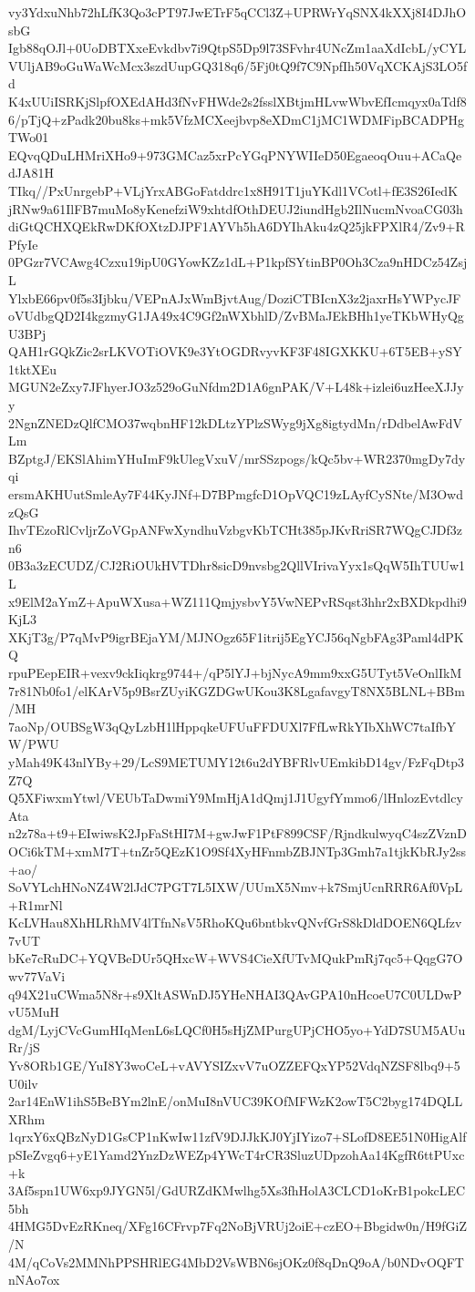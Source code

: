 vy3YdxuNhb72hLfK3Qo3cPT97JwETrF5qCCl3Z+UPRWrYqSNX4kXXj8I4DJhOsbG
Igb88qOJl+0UoDBTXxeEvkdbv7i9QtpS5Dp9l73SFvhr4UNcZm1aaXdIcbL/yCYL
VUljAB9oGuWaWcMcx3szdUupGQ318q6/5Fj0tQ9f7C9NpfIh50VqXCKAjS3LO5fd
K4xUUiISRKjSlpfOXEdAHd3fNvFHWde2s2fsslXBtjmHLvwWbvEfIcmqyx0aTdf8
6/pTjQ+zPadk20bu8ks+mk5VfzMCXeejbvp8eXDmC1jMC1WDMFipBCADPHgTWo01
EQvqQDuLHMriXHo9+973GMCaz5xrPcYGqPNYWIIeD50EgaeoqOuu+ACaQedJA81H
TIkq//PxUnrgebP+VLjYrxABGoFatddrc1x8H91T1juYKdl1VCotl+fE3S26IedK
jRNw9a61IlFB7muMo8yKenefziW9xhtdfOthDEUJ2iundHgb2IlNucmNvoaCG03h
diGtQCHXQEkRwDKfOXtzDJPF1AYVh5hA6DYIhAku4zQ25jkFPXlR4/Zv9+RPfyIe
0PGzr7VCAwg4Czxu19ipU0GYowKZz1dL+P1kpfSYtinBP0Oh3Cza9nHDCz54ZsjL
YlxbE66pv0f5s3Ijbku/VEPnAJxWmBjvtAug/DoziCTBIcnX3z2jaxrHsYWPycJF
oVUdbgQD2I4kgzmyG1JA49x4C9Gf2nWXbhlD/ZvBMaJEkBHh1yeTKbWHyQgU3BPj
QAH1rGQkZic2srLKVOTiOVK9e3YtOGDRvyvKF3F48IGXKKU+6T5EB+ySY1tktXEu
MGUN2eZxy7JFhyerJO3z529oGuNfdm2D1A6gnPAK/V+L48k+izlei6uzHeeXJJyy
2NgnZNEDzQlfCMO37wqbnHF12kDLtzYPlzSWyg9jXg8igtydMn/rDdbelAwFdVLm
BZptgJ/EKSlAhimYHuImF9kUlegVxuV/mrSSzpogs/kQc5bv+WR2370mgDy7dyqi
ersmAKHUutSmleAy7F44KyJNf+D7BPmgfcD1OpVQC19zLAyfCySNte/M3OwdzQsG
IhvTEzoRlCvljrZoVGpANFwXyndhuVzbgvKbTCHt385pJKvRriSR7WQgCJDf3zn6
0B3a3zECUDZ/CJ2RiOUkHVTDhr8sicD9nvsbg2QllVIrivaYyx1sQqW5IhTUUw1L
x9ElM2aYmZ+ApuWXusa+WZ111QmjysbvY5VwNEPvRSqst3hhr2xBXDkpdhi9KjL3
XKjT3g/P7qMvP9igrBEjaYM/MJNOgz65F1itrij5EgYCJ56qNgbFAg3Paml4dPKQ
rpuPEepEIR+vexv9ckIiqkrg9744+/qP5lYJ+bjNycA9mm9xxG5UTyt5VeOnlIkM
7r81Nb0fo1/elKArV5p9BsrZUyiKGZDGwUKou3K8LgafavgyT8NX5BLNL+BBm/MH
7aoNp/OUBSgW3qQyLzbH1lHppqkeUFUuFFDUXl7FfLwRkYIbXhWC7taIfbYW/PWU
yMah49K43nlYBy+29/LcS9METUMY12t6u2dYBFRlvUEmkibD14gv/FzFqDtp3Z7Q
Q5XFiwxmYtwl/VEUbTaDwmiY9MmHjA1dQmj1J1UgyfYmmo6/lHnlozEvtdlcyAta
n2z78a+t9+EIwiwsK2JpFaStHI7M+gwJwF1PtF899CSF/RjndkulwyqC4szZVznD
OCi6kTM+xmM7T+tnZr5QEzK1O9Sf4XyHFnmbZBJNTp3Gmh7a1tjkKbRJy2ss+ao/
SoVYLchHNoNZ4W2lJdC7PGT7L5IXW/UUmX5Nmv+k7SmjUcnRRR6Af0VpL+R1mrNl
KcLVHau8XhHLRhMV4lTfnNsV5RhoKQu6bntbkvQNvfGrS8kDldDOEN6QLfzv7vUT
bKe7cRuDC+YQVBeDUr5QHxcW+WVS4CieXfUTvMQukPmRj7qc5+QqgG7Owv77VaVi
q94X21uCWma5N8r+s9XltASWnDJ5YHeNHAI3QAvGPA10nHcoeU7C0ULDwPvU5MuH
dgM/LyjCVcGumHIqMenL6sLQCf0H5sHjZMPurgUPjCHO5yo+YdD7SUM5AUuRr/jS
Yv8ORb1GE/YuI8Y3woCeL+vAVYSIZxvV7uOZZEFQxYP52VdqNZSF8lbq9+5U0ilv
2ar14EnW1ihS5BeBYm2lnE/onMuI8nVUC39KOfMFWzK2owT5C2byg174DQLLXRhm
1qrxY6xQBzNyD1GsCP1nKwIw11zfV9DJJkKJ0YjIYizo7+SLofD8EE51N0HigAlf
pSIeZvgq6+yE1Yamd2YnzDzWEZp4YWcT4rCR3SluzUDpzohAa14KgfR6ttPUxc+k
3Af5spn1UW6xp9JYGN5l/GdURZdKMwlhg5Xs3fhHolA3CLCD1oKrB1pokcLEC5bh
4HMG5DvEzRKneq/XFg16CFrvp7Fq2NoBjVRUj2oiE+czEO+Bbgidw0n/H9fGiZ/N
4M/qCoVs2MMNhPPSHRlEG4MbD2VsWBN6sjOKz0f8qDnQ9oA/b0NDvOQFTnNAo7ox
